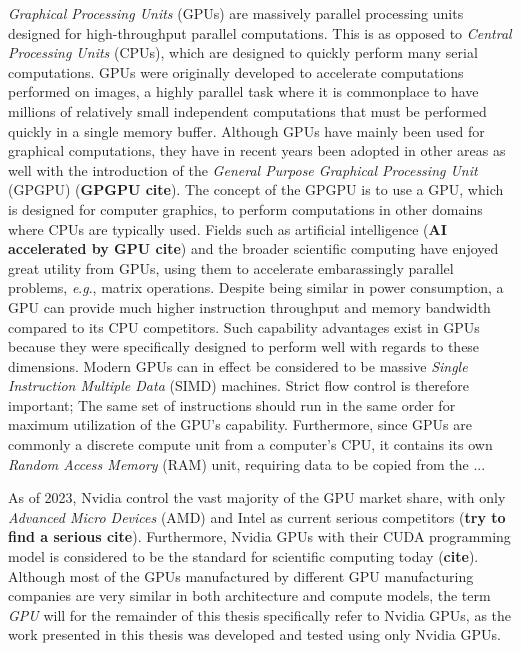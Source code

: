 \textit{Graphical Processing Units} (GPUs) are massively parallel processing units designed for high-throughput parallel computations.
This is as opposed to \textit{Central Processing Units} (CPUs), which are designed to quickly perform many serial computations.
GPUs were originally developed to accelerate computations performed on images, a highly parallel task where it is commonplace to have millions of relatively small independent computations that must be performed quickly in a single memory buffer.
Although GPUs have mainly been used for graphical computations, they have in recent years been adopted in other areas as well with the introduction of the \textit{General Purpose Graphical Processing Unit} (GPGPU) (\textbf{GPGPU cite}). 
The concept of the GPGPU is to use a GPU, which is designed for computer graphics, to perform computations in other domains where CPUs are typically used.
Fields such as artificial intelligence (\textbf{AI accelerated by GPU cite}) and the broader scientific computing have enjoyed great utility from GPUs, using them to accelerate embarassingly parallel problems, \textit{e}.\textit{g}., matrix operations.
Despite being similar in power consumption, a GPU can provide much higher instruction throughput and memory bandwidth compared to its CPU competitors.
Such capability advantages exist in GPUs because they were specifically designed to perform well with regards to these dimensions.
Modern GPUs can in effect be considered to be massive \textit{Single Instruction Multiple Data} (SIMD) machines. Strict flow control is therefore important; The same set of instructions should run in the same order for maximum utilization of the GPU's capability.
Furthermore, since GPUs are commonly a discrete compute unit from a computer's CPU, it contains its own \textit{Random Access Memory} (RAM) unit, requiring data to be copied from the ...


As of 2023, Nvidia control the vast majority of the GPU market share, with only \textit{Advanced Micro Devices} (AMD) and Intel as current serious competitors (\textbf{try to find a serious cite}).
Furthermore, Nvidia GPUs with their CUDA programming model is considered to be the standard for scientific computing today (\textbf{cite}).
Although most of the GPUs manufactured by different GPU manufacturing companies are very similar in both architecture and compute models, the term \textit{GPU} will for the remainder of this thesis specifically refer to Nvidia GPUs, as the work presented in this thesis was developed and tested using only Nvidia GPUs.

